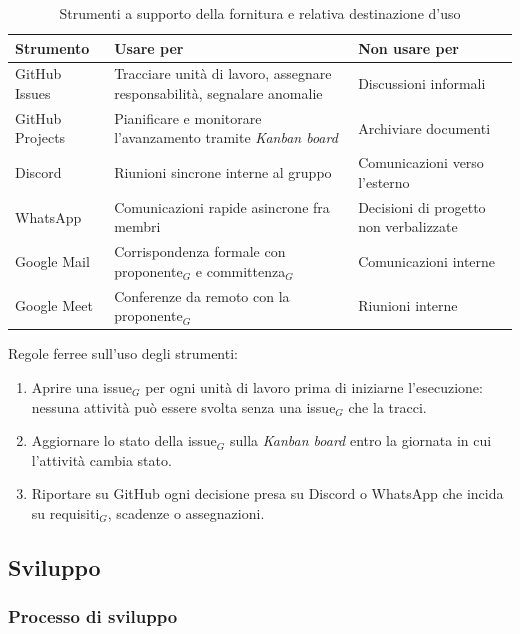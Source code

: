 \documentclass[a4paper, 10pt]{article}
\renewcommand{\arraystretch}{1.2}
\begin{document}
\begin{table}[H]
    \centering
    \renewcommand{\arraystretch}{1.3}
    \begin{tabularx}{\textwidth}{|l|L|L|}
        \hline
        \textbf{Strumento} & \textbf{Usare per} & \textbf{Non usare per} \\
        \hline
        GitHub Issues & Tracciare unità di lavoro, assegnare responsabilità, segnalare anomalie & Discussioni informali \\ \hline
        GitHub Projects & Pianificare e monitorare l'avanzamento tramite \textit{Kanban board} & Archiviare documenti \\ \hline
        Discord & Riunioni sincrone interne al gruppo & Comunicazioni verso l'esterno \\ \hline
        WhatsApp & Comunicazioni rapide asincrone fra membri & Decisioni di progetto non verbalizzate \\ \hline
        Google Mail & Corrispondenza formale con proponente$_G$ e committenza$_G$ & Comunicazioni interne \\ \hline
        Google Meet & Conferenze da remoto con la proponente$_G$ & Riunioni interne \\ \hline
    \end{tabularx}
    \caption{Strumenti a supporto della fornitura e relativa destinazione d'uso}
\end{table}

\noindent Regole ferree sull'uso degli strumenti:
\begin{enumerate}
    \item Aprire una issue$_G$ per ogni unità di lavoro prima di iniziarne l'esecuzione: nessuna attività può essere svolta senza una issue$_G$ che la tracci.
    \item Aggiornare lo stato della issue$_G$ sulla \textit{Kanban board} entro la giornata in cui l'attività cambia stato.
    \item Riportare su GitHub ogni decisione presa su Discord o WhatsApp che incida su requisiti$_G$, scadenze o assegnazioni.
\end{enumerate}

\subsection{Sviluppo}

\subsubsection{Processo di sviluppo}
\end{document}
